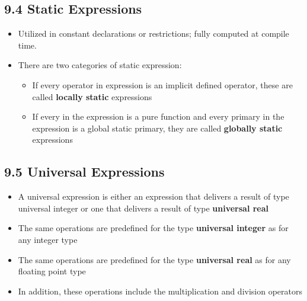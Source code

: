 \documentclass[a4paper,12pt]{article}
\begin{document}
	
	\subsection*{9.4 Static Expressions}
	\begin{itemize}
		\item Utilized in constant declarations or restrictions; fully computed at compile time.
		\item There are two categories of static expression:
		\begin{itemize}
			\item If every operator in expression is an implicit defined operator, these are called \textbf{locally static}  expressions
			\item If every in the expression is a pure function and every primary in the expression is a global static primary, they are called \textbf{globally static}  expressions
		\end{itemize}
	\end{itemize}
	
	\subsection*{9.5 Universal Expressions}
	\begin{itemize}
		\item A universal expression is either an expression that delivers a result of type universal integer or one that delivers a result of type \textbf{universal real}
		\item The same operations are predefined for the type \textbf{universal integer} as for any integer type
		\item The same operations are predefined for the type \textbf{universal real} as for any floating point type
		\item In addition, these operations include the multiplication and division operators
		
	\end{itemize}
	
	
	
\end{document}
